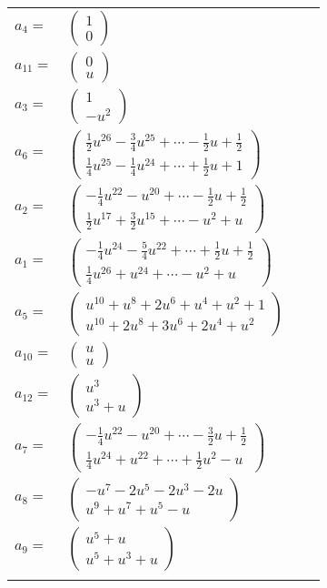 \documentclass[1p]{elsarticle_modified}
\theoremstyle{definition}
\begin{document}
\begin{tabular}{m{7pt} m{180pt} m{7pt} m{180pt} }
\flushright $a_{4}=$&$\begin{pmatrix}1\\0\end{pmatrix}$ \\
\flushright $a_{11}=$&$\begin{pmatrix}0\\u\end{pmatrix}$ \\
\flushright $a_{3}=$&$\begin{pmatrix}1\\- u^2\end{pmatrix}$ \\
\flushright $a_{6}=$&$\begin{pmatrix}\frac{1}{2} u^{26}-\frac{3}{4} u^{25}+\cdots-\frac{1}{2} u+\frac{1}{2}\\\frac{1}{4} u^{25}-\frac{1}{4} u^{24}+\cdots+\frac{1}{2} u+1\end{pmatrix}$ \\
\flushright $a_{2}=$&$\begin{pmatrix}-\frac{1}{4} u^{22}- u^{20}+\cdots-\frac{1}{2} u+\frac{1}{2}\\\frac{1}{2} u^{17}+\frac{3}{2} u^{15}+\cdots- u^2+u\end{pmatrix}$ \\
\flushright $a_{1}=$&$\begin{pmatrix}-\frac{1}{4} u^{24}-\frac{5}{4} u^{22}+\cdots+\frac{1}{2} u+\frac{1}{2}\\\frac{1}{4} u^{26}+u^{24}+\cdots- u^2+u\end{pmatrix}$ \\
\flushright $a_{5}=$&$\begin{pmatrix}u^{10}+u^8+2 u^6+u^4+u^2+1\\u^{10}+2 u^8+3 u^6+2 u^4+u^2\end{pmatrix}$ \\
\flushright $a_{10}=$&$\begin{pmatrix}u\\u\end{pmatrix}$ \\
\flushright $a_{12}=$&$\begin{pmatrix}u^3\\u^3+u\end{pmatrix}$ \\
\flushright $a_{7}=$&$\begin{pmatrix}-\frac{1}{4} u^{22}- u^{20}+\cdots-\frac{3}{2} u+\frac{1}{2}\\\frac{1}{4} u^{24}+u^{22}+\cdots+\frac{1}{2} u^2- u\end{pmatrix}$ \\
\flushright $a_{8}=$&$\begin{pmatrix}- u^7-2 u^5-2 u^3-2 u\\u^9+u^7+u^5- u\end{pmatrix}$ \\
\flushright $a_{9}=$&$\begin{pmatrix}u^5+u\\u^5+u^3+u\end{pmatrix}$\\&\end{tabular}
\end{document}
